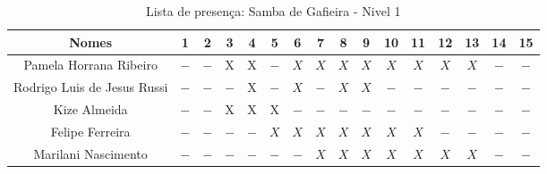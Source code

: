 \documentclass[a4paper,12pt]{article}
\begin{document}
\begin{landscape}
\begin{table}[!htbp]
\vspace*{-2cm}\centering
\caption{Lista de presença: Samba de Gafieira - Nivel 1}
\begin{tabular}{|*{16}{c|}}
\hline%
 Nomes                                   & 1  & 2  & 3  & 4  & 5  & 6   & 7   & 8   & 9   & 10  & 11  & 12  & 13  & 14  & 15  \\ \hline
 \LARGE Pamela Horrana Ribeiro           &$-$ &$-$ &X   &X   &$-$ &$X$  &$X$  &$X$  &$X$  &$X$  &$X$  &$X$  &$X$  &$-$  &$-$  \\ \hline
 \LARGE Rodrigo Luis de Jesus Russi      &$-$ &$-$ &$-$ &X   &$-$ &$X$  &$-$  &$X$  &$X$  &$-$  &$-$  &$-$  &$-$  &$-$  &$-$  \\ \hline
 \LARGE Kize Almeida                     &$-$ &$-$ &X   &X   &X   &$-$  &$-$  &$-$  &$-$  &$-$  &$-$  &$-$  &$-$  &$-$  &$-$  \\ \hline
 \LARGE Felipe Ferreira                  &$-$ &$-$ &$-$ &$-$ &$X$ &$X$  &$X$  &$X$  &$X$  &$X$  &$X$  &$-$  &$-$  &$-$  &$-$  \\ \hline
 \LARGE Marilani Nascimento              &$-$ &$-$ &$-$ &$-$ &$-$ &$-$  &$X$  &$X$  &$X$  &$X$  &$X$  &$X$  &$X$  &$-$  &$-$  \\ \hline

 \hline
\end{tabular}
\label{actividades2}
\end{table}

\end{landscape}
\end{document}
